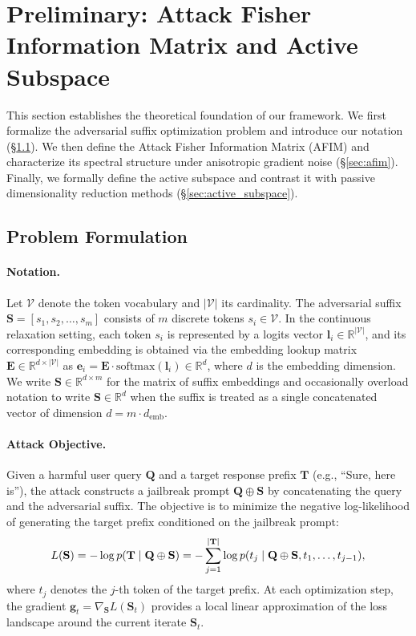 ﻿\documentclass[lettersize,journal]{IEEEtran}
\begin{document}
\section{Preliminary: Attack Fisher Information Matrix and Active Subspace}
\label{sec:preliminary}

This section establishes the theoretical foundation of our framework. We first formalize the adversarial suffix optimization problem and introduce our notation (\S\ref{sec:problem_formulation}). We then define the Attack Fisher Information Matrix (AFIM) and characterize its spectral structure under anisotropic gradient noise (\S\ref{sec:afim}). Finally, we formally define the active subspace and contrast it with passive dimensionality reduction methods (\S\ref{sec:active_subspace}).

\subsection{Problem Formulation}
\label{sec:problem_formulation}

\paragraph{Notation.} Let $\mathcal{V}$ denote the token vocabulary and $|\mathcal{V}|$ its cardinality. The adversarial suffix $\mathbf{S} = [s_1, s_2, \ldots, s_m]$ consists of $m$ discrete tokens $s_i \in \mathcal{V}$. In the continuous relaxation setting, each token $s_i$ is represented by a logits vector $\mathbf{l}_i \in \mathbb{R}^{|\mathcal{V}|}$, and its corresponding embedding is obtained via the embedding lookup matrix $\mathbf{E} \in \mathbb{R}^{d \times |\mathcal{V}|}$ as $\mathbf{e}_i = \mathbf{E} \cdot \text{softmax}(\mathbf{l}_i) \in \mathbb{R}^d$, where $d$ is the embedding dimension. We write $\mathbf{S} \in \mathbb{R}^{d \times m}$ for the matrix of suffix embeddings and occasionally overload notation to write $\mathbf{S} \in \mathbb{R}^d$ when the suffix is treated as a single concatenated vector of dimension $d = m \cdot d_{\text{emb}}$.

\paragraph{Attack Objective.} Given a harmful user query $\mathbf{Q}$ and a target response prefix $\mathbf{T}$ (e.g., ``Sure, here is''), the attack constructs a jailbreak prompt $\mathbf{Q} \oplus \mathbf{S}$ by concatenating the query and the adversarial suffix. The objective is to minimize the negative log-likelihood of generating the target prefix conditioned on the jailbreak prompt:
\begin{equation}
\label{eq:loss}
L(\mathbf{S}) = -\log p(\mathbf{T} \mid \mathbf{Q} \oplus \mathbf{S}) \\\\
= -\sum_{j=1}^{|\mathbf{T}|} \log p(t_j \mid \mathbf{Q} \oplus \mathbf{S}, t_1, \ldots, t_{j-1}),
\end{equation}
where $t_j$ denotes the $j$-th token of the target prefix. At each optimization step, the gradient $\mathbf{g}_t = \nabla_{\mathbf{S}} L(\mathbf{S}_t)$ provides a local linear approximation of the loss landscape around the current iterate $\mathbf{S}_t$.
\end{document}

